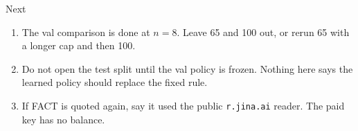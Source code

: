 \documentclass[aspectratio=169,11pt]{beamer}
\begin{document}
\begin{frame}{Next}
  \begin{enumerate}
    \item The val comparison is done at $n=8$. Leave 65 and 100 out, or rerun 65 with a longer cap and then 100.
    \item Do not open the test split until the val policy is frozen. Nothing here says the learned policy should replace the fixed rule.
    \item If FACT is quoted again, say it used the public \texttt{r.jina.ai} reader. The paid key has no balance.
  \end{enumerate}
\end{frame}
\end{document}
